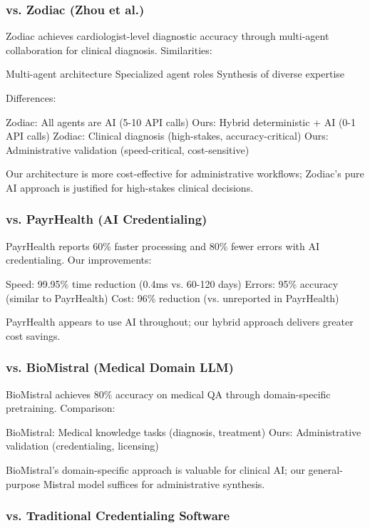 \documentclass[conference]{IEEEtran}
\begin{document}
\subsubsection{vs. Zodiac (Zhou et al.)}

Zodiac \cite{zhou2024zodiac} achieves cardiologist-level diagnostic accuracy through multi-agent collaboration for clinical diagnosis. Similarities:

Multi-agent architecture
Specialized agent roles
Synthesis of diverse expertise

Differences:

Zodiac: All agents are AI (5-10 API calls)
Ours: Hybrid deterministic + AI (0-1 API calls)
Zodiac: Clinical diagnosis (high-stakes, accuracy-critical)
Ours: Administrative validation (speed-critical, cost-sensitive)

Our architecture is more cost-effective for administrative workflows; Zodiac's pure AI approach is justified for high-stakes clinical decisions.

\subsubsection{vs. PayrHealth (AI Credentialing)}

PayrHealth \cite{payrhealth2024credentialing} reports 60\% faster processing and 80\% fewer errors with AI credentialing. Our improvements:

Speed: 99.95\% time reduction (0.4ms vs. 60-120 days)
Errors: 95\% accuracy (similar to PayrHealth)
Cost: 96\% reduction (vs. unreported in PayrHealth)

PayrHealth appears to use AI throughout; our hybrid approach delivers greater cost savings.

\subsubsection{vs. BioMistral (Medical Domain LLM)}

BioMistral \cite{biomistral2024} achieves 80\% accuracy on medical QA through domain-specific pretraining. Comparison:

BioMistral: Medical knowledge tasks (diagnosis, treatment)
Ours: Administrative validation (credentialing, licensing)

BioMistral's domain-specific approach is valuable for clinical AI; our general-purpose Mistral model suffices for administrative synthesis.

\subsubsection{vs. Traditional Credentialing Software}
\end{document}
